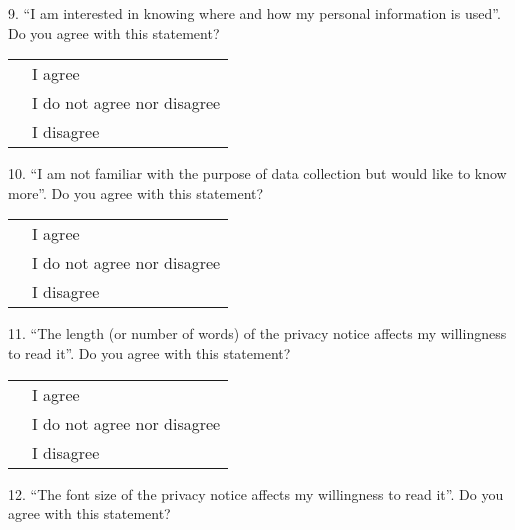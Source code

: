 9. ``I am interested in knowing where and how my personal information is used''. Do you agree with this statement?

\vspace{0.6cm}
\begin{center}
    \noindent\begin{tabularx}{0.8\textwidth}{ >{\centering\arraybackslash}X >{\raggedright\arraybackslash}X }
        {\huge $\circ$} & I agree \\[0.2cm]
        {\huge $\circ$} & I do not agree nor disagree \\[0.2cm]
        {\huge $\circ$} & I disagree
    \end{tabularx}
\end{center}
\vspace{0.6cm}

10. ``I am not familiar with the purpose of data collection but would like to know more''. Do you agree with this statement?

\vspace{0.6cm}
\begin{center}
    \noindent\begin{tabularx}{0.8\textwidth}{ >{\centering\arraybackslash}X >{\raggedright\arraybackslash}X }
        {\huge $\circ$} & I agree \\[0.2cm]
        {\huge $\circ$} & I do not agree nor disagree \\[0.2cm]
        {\huge $\circ$} & I disagree
    \end{tabularx}
\end{center}
\vspace{0.6cm}

11. ``The length (or number of words) of the privacy notice affects my willingness to read it''. Do you agree with this statement?

\vspace{0.6cm}
\begin{center}
    \noindent\begin{tabularx}{0.8\textwidth}{ >{\centering\arraybackslash}X >{\raggedright\arraybackslash}X }
        {\huge $\circ$} & I agree \\[0.2cm]
        {\huge $\circ$} & I do not agree nor disagree \\[0.2cm]
        {\huge $\circ$} & I disagree
    \end{tabularx}
\end{center}
\vspace{0.6cm}

12. ``The font size of the privacy notice affects my willingness to read it''. Do you agree with this statement?


